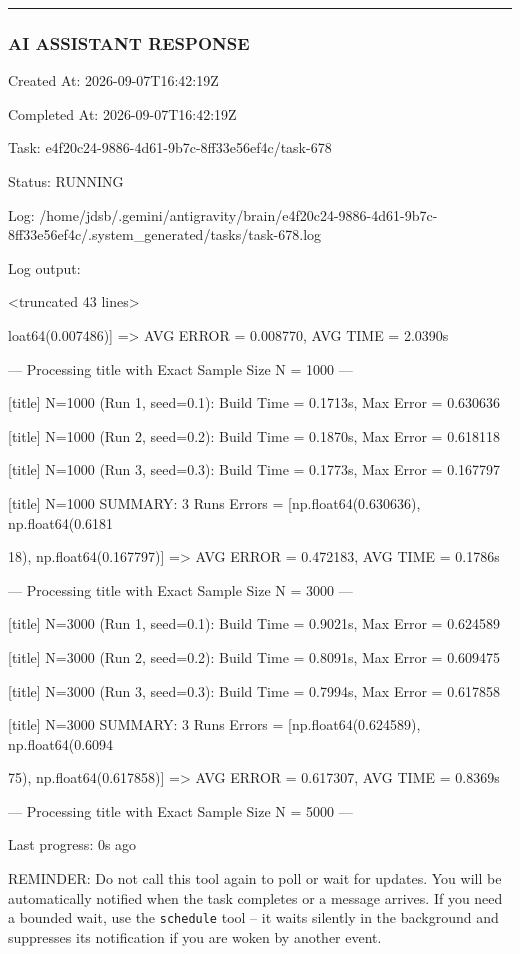 \documentclass[11pt,a4paper]{article}
\begin{document}
\hrule

\subsubsection{AI ASSISTANT RESPONSE}

Created At: 2026-09-07T16:42:19Z

Completed At: 2026-09-07T16:42:19Z

Task: e4f20c24-9886-4d61-9b7c-8ff33e56ef4c/task-678

Status: RUNNING

Log: /home/jdsb/.gemini/antigravity/brain/e4f20c24-9886-4d61-9b7c-8ff33e56ef4c/.system\_generated/tasks/task-678.log

Log output:

<truncated 43 lines>

loat64(0.007486)] => AVG ERROR = 0.008770, AVG TIME = 2.0390s


--- Processing title with Exact Sample Size N = 1000 ---

[title] N=1000 (Run 1, seed=0.1): Build Time = 0.1713s, Max Error = 0.630636

[title] N=1000 (Run 2, seed=0.2): Build Time = 0.1870s, Max Error = 0.618118

[title] N=1000 (Run 3, seed=0.3): Build Time = 0.1773s, Max Error = 0.167797

[title] N=1000 SUMMARY: 3 Runs Errors = [np.float64(0.630636), np.float64(0.6181

18), np.float64(0.167797)] => AVG ERROR = 0.472183, AVG TIME = 0.1786s

--- Processing title with Exact Sample Size N = 3000 ---

[title] N=3000 (Run 1, seed=0.1): Build Time = 0.9021s, Max Error = 0.624589

[title] N=3000 (Run 2, seed=0.2): Build Time = 0.8091s, Max Error = 0.609475

[title] N=3000 (Run 3, seed=0.3): Build Time = 0.7994s, Max Error = 0.617858

[title] N=3000 SUMMARY: 3 Runs Errors = [np.float64(0.624589), np.float64(0.6094

75), np.float64(0.617858)] => AVG ERROR = 0.617307, AVG TIME = 0.8369s

--- Processing title with Exact Sample Size N = 5000 ---


Last progress: 0s ago



REMINDER: Do not call this tool again to poll or wait for updates. You will be automatically notified when the task completes or a message arrives. If you need a bounded wait, use the \texttt{schedule} tool -- it waits silently in the background and suppresses its notification if you are woken by another event.
\end{document}
